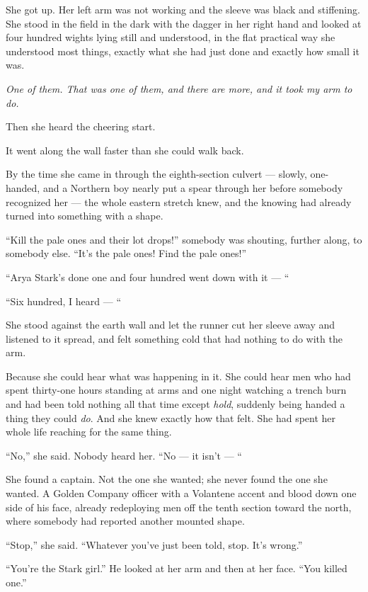 She got up. Her left arm was not working and the sleeve was black and stiffening. She stood in the field in the dark with the dagger in her right hand and looked at four hundred wights lying still and understood, in the flat practical way she understood most things, exactly what she had just done and exactly how small it was.

\textit{One of them. That was one of them, and there are more, and it took my arm to do.}

Then she heard the cheering start.

\sceneBreak

It went along the wall faster than she could walk back.

By the time she came in through the eighth-section culvert — slowly, one-handed, and a Northern boy nearly put a spear through her before somebody recognized her — the whole eastern stretch knew, and the knowing had already turned into something with a shape.

“Kill the pale ones and their lot drops!” somebody was shouting, further along, to somebody else. “It’s the pale ones! Find the pale ones!”

“Arya Stark’s done one and four hundred went down with it — “

“Six hundred, I heard — “

She stood against the earth wall and let the runner cut her sleeve away and listened to it spread, and felt something cold that had nothing to do with the arm.

Because she could hear what was happening in it. She could hear men who had spent thirty-one hours standing at arms and one night watching a trench burn and had been told nothing all that time except \textit{hold}, suddenly being handed a thing they could \textit{do}. And she knew exactly how that felt. She had spent her whole life reaching for the same thing.

“No,” she said. Nobody heard her. “No — it isn’t — “

She found a captain. Not the one she wanted; she never found the one she wanted. A Golden Company officer with a Volantene accent and blood down one side of his face, already redeploying men off the tenth section toward the north, where somebody had reported another mounted shape.

“Stop,” she said. “Whatever you’ve just been told, stop. It’s wrong.”

“You’re the Stark girl.” He looked at her arm and then at her face. “You killed one.”


